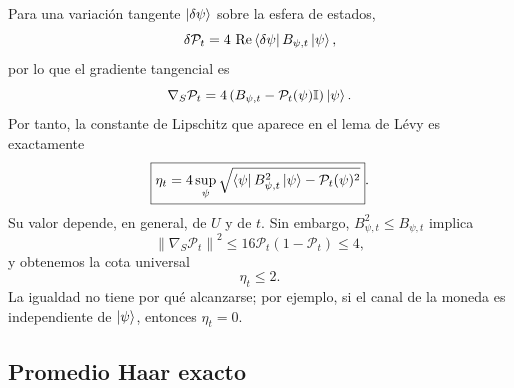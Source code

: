 Para una variación tangente $\ket{\delta\psi}$ sobre la esfera de estados,
\begin{equation}
    \delta\mathcal P_t
    =
    4\,\operatorname{Re}
    \bra{\delta\psi}B_{\psi,t}\ket{\psi},
\end{equation}
por lo que el gradiente tangencial es
\begin{equation}
    \nabla_S\mathcal P_t
    =
    4\left(B_{\psi,t}-\mathcal P_t(\psi)\mathbb I\right)\ket{\psi}.
\end{equation}
Por tanto, la constante de Lipschitz que aparece en el lema de Lévy es
exactamente
\begin{equation}
    \boxed{
    \eta_t
    =
    4\sup_{\psi}
    \sqrt{
        \bra{\psi}B_{\psi,t}^2\ket{\psi}
        -\mathcal P_t(\psi)^2
    }}.
    \label{eq:ExactLipschitzChoi}
\end{equation}
Su valor depende, en general, de $U$ y de $t$. Sin embargo,
$B_{\psi,t}^2\leq B_{\psi,t}$ implica
\begin{equation}
    \left\|\nabla_S\mathcal P_t\right\|^2
    \leq
    16\mathcal P_t(1-\mathcal P_t)
    \leq4,
\end{equation}
y obtenemos la cota universal
\begin{equation}
    \boxed{\eta_t\leq2.}
    \label{eq:LipschitzBoundChoi}
\end{equation}
La igualdad no tiene por qué alcanzarse; por ejemplo, si el canal de la
moneda es independiente de $\ket{\psi}$, entonces $\eta_t=0$.

\subsection{Promedio Haar exacto}

